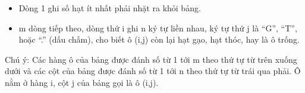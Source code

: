 \begin{itemize}
	\item     Dòng 1 ghi số hạt ít nhất phải nhặt ra khỏi bảng.   
	\item     m dòng tiếp theo, dòng thứ i ghi n ký tự liền nhau, ký tự thứ j là “G”, “T”, hoặc “.” (dấu chấm), cho biết ô (i,j) còn lại hạt gạo, hạt thóc, hay là ô trống.   
\end{itemize}

   Chú ý: Các hàng ô của bảng được đánh số từ 1 tới m theo thứ tự từ trên xuống dưới và các cột của bảng được đánh số từ 1 tới n theo thứ tự từ trái qua phải. Ô nằm ở hàng i, cột j của bảng gọi là ô (i,j).  

\